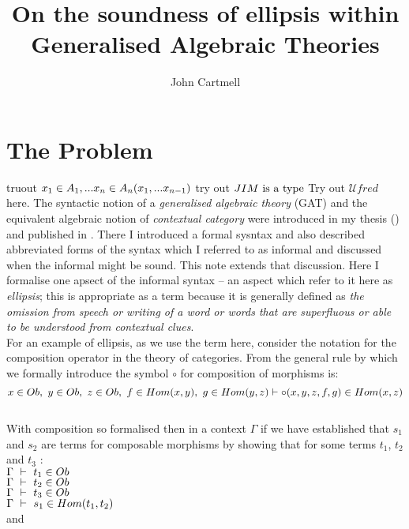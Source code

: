 \documentclass[10pt,a4paper,fleqn]{article}
\title{On the soundness of ellipsis within Generalised Algebraic Theories}
\author{John Cartmell}
\newcommand{\gat}[1][U]{
\ensuremath{\mathcal{#1}} }
\begin{document}
\maketitle


\section{The Problem}
truout $x_1 \in A_1,... x_{n} \in A_{n}(x_1,...x_{n-1})$
try out $JIM\mbox{ is a type}$
Try out $\gat{fred}$ here.
The syntactic notion of a \textit{generalised algebraic theory} (GAT) and the  equivalent algebraic notion of \textit{contextual category} were introduced in my thesis (\cite{Cartmell78}) and published in \cite{Cartmell86}. 
There I introduced a formal sysntax and also described abbreviated forms of the syntax which I referred to as informal and discussed when the informal might be sound. This note extends that discussion. Here I formalise one apsect of the informal syntax -- an aspect which refer to it here as \textit{ellipsis}; this is appropriate as a term because it is generally defined as  \textit{the omission from speech or writing of a word or words that are superfluous or able to be understood from contextual clues}. \\

\noindent 
For an example of ellipsis, as we use the term here, consider the notation for the composition operator in the theory of categories. From \cite{Cartmell86} the general rule by which we formally introduce the symbol $\circ$ for composition of morphisms is:\\
$$\ofT{x}{Ob},\ \ofT{y}{Ob},\ \ofT{z}{Ob},\ \ofT{f}{Hom(x,y)},\ \ofT{g}{Hom(y,z)} \tstyle \ofT{\circ(x, y, z, f,g)}{Hom(x,z)}\label{composition intro}$$ \\
\noindent
With composition so formalised then in a context $\Gamma$ if we have established that $s_1$ and $s_2$ are 
terms for composable morphisms by showing that for some terms $t_1$, $t_2$ and $t_3$ : \\

$\Gamma\ \vdash\ t_1 \in Ob $ \\

$\Gamma\ \vdash\ t_2 \in Ob $ \\

$\Gamma\ \vdash\ t_3 \in Ob $ \\

$\Gamma\ \tstyle\ \ofT{s_1}{Hom(t_1,t_2)}$ \\

\noindent
and \\
\end{document}
